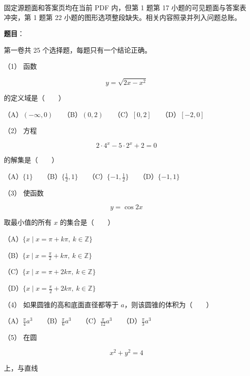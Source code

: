 

\begin{gktip}
固定源题面和答案页均在当前 PDF 内，但第 1 题第 17 小题的可见题面与答案表冲突，第 1 题第 22 小题的图形选项整段缺失。相关内容照录并列入问题总账。
\end{gktip}

\begin{answer}

\textbf{题目}：

第一卷共 25 个选择题，每题只有一个结论正确。

（1） 函数

\nopagebreak[4]
\[
y=\sqrt{2x-x^2}
\]

的定义域是\mbox{（　　）}

（A）$(-\infty,0)$　　（B）$(0,2)$　　（C）$[0,2]$　　（D）$[-2,0]$

（2） 方程

\nopagebreak[4]
\[
2\cdot4^x-5\cdot2^x+2=0
\]

的解集是\mbox{（　　）}

（A）$\{1\}$　　（B）$\{\frac12,1\}$　　（C）$\{-1,\frac12\}$　　（D）$\{-1,1\}$

（3） 使函数

\nopagebreak[4]
\[
y=\cos2x
\]

取最小值的所有 $x$ 的集合是\mbox{（　　）}

（A）$\{x\mid x=\pi+k\pi,\ k\in\mathbb Z\}$

（B）$\{x\mid x=\frac\pi2+k\pi,\ k\in\mathbb Z\}$

（C）$\{x\mid x=\pi+2k\pi,\ k\in\mathbb Z\}$

（D）$\{x\mid x=\frac\pi2+2k\pi,\ k\in\mathbb Z\}$

（4） 如果圆锥的高和底面直径都等于 $a$，则该圆锥的体积为\mbox{（　　）}

（A）$\frac\pi4a^3$　　（B）$\frac\pi6a^3$　　（C）$\frac\pi{12}a^3$　　（D）$\frac\pi3a^3$

（5） 在圆

\nopagebreak[4]
\[
x^2+y^2=4
\]

上，与直线


\end{answer}
